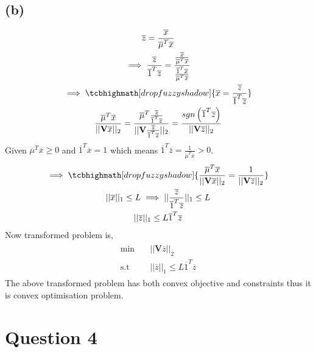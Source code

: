 \documentclass{article}
\begin{document}
\subsection*{(b)}
\begin{gather*}
	\overline{z} = \frac{\overline{x}}{\overline{\mu}^T\overline{x}}\\\implies
	\frac{\overline{z}}{\overline{1}^T\overline{z}} = \frac{\frac{\overline{x}}{\overline{\mu}^T\overline{x}}}{\frac{\overline{1}^T\overline{x}}{\overline{\mu}^T\overline{x}}}\\
	\implies \tcbhighmath[drop fuzzy shadow]{\overline{x} = \frac{\overline{z}}{\overline{1}^T\overline{z}}}\\
	\frac{\overline{\mu}^T\overline{x}}{||\mathbf{V}\overline{x}||_2} = \frac{\overline{\mu}^T\frac{\overline{z}}{\overline{1}^T\overline{z}}}{||\mathbf{V}\frac{\overline{z}}{\overline{1}^T\overline{z}}||_2} = \frac{sgn\left(\overline{1}^T\overline{z}\right)}{||\mathbf{V}\overline{z}||_2}
\end{gather*}
Given $\overline{\mu}^T\overline{x} \ge 0$ and $\overline{1}^T\overline{x} = 1$ which means $\overline{1}^T\overline{z} = \frac{1}{\overline{\mu}^T\overline{x}} > 0$.
\begin{gather*}
	\implies \tcbhighmath[drop fuzzy shadow]{\frac{\overline{\mu}^T\overline{x}}{||\mathbf{V}\overline{x}||_2} = \frac{1}{||\mathbf{V}\overline{z}||_2}}\\
	||\overline{x}||_1 \le L \implies ||\frac{\overline{z}}{\overline{1}^T\overline{z}}||_1 \le L\\
	{||\overline{z}||_1} \le L{\overline{1}^T\overline{z}}
\end{gather*}
Now transformed problem is,
\begin{gather*}
	\begin{aligned}
		\min \quad & ||\mathbf{V}\overline{z}||_2\\
		\textrm{s.t} \quad & {||\overline{z}||_1} \le L{\overline{1}^T\overline{z}}
	\end{aligned}
\end{gather*}
The above transformed problem has both convex objective and constraints thus it is convex optimisation problem.
\section*{\hfil Question 4}
\end{document}
